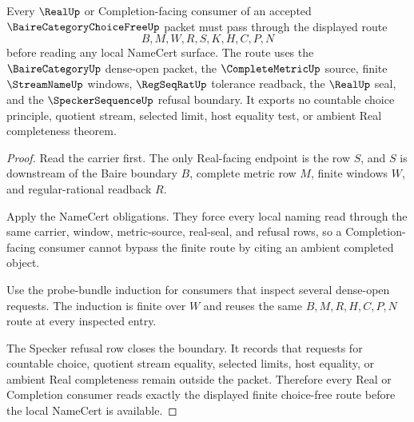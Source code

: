 \begin{theorem}
\label{thm:baire-category-choice-free-real-completion-boundary}
Every $\RealUp$ or Completion-facing consumer of an accepted $\BaireCategoryChoiceFreeUp$ packet must pass through the displayed route
$$
B,M,W,R,S,K,H,C,P,N
$$
before reading any local NameCert surface. The route uses the $\BaireCategoryUp$ dense-open packet, the $\CompleteMetricUp$ source, finite $\StreamNameUp$ windows, $\RegSeqRatUp$ tolerance readback, the $\RealUp$ seal, and the $\SpeckerSequenceUp$ refusal boundary. It exports no countable choice principle, quotient stream, selected limit, host equality test, or ambient Real completeness theorem.
\end{theorem}
\begin{proof}
Read the carrier first. The only Real-facing endpoint is the row $S$, and $S$ is downstream of the Baire boundary $B$, complete metric row $M$, finite windows $W$, and regular-rational readback $R$.

Apply the NameCert obligations. They force every local naming read through the same carrier, window, metric-source, real-seal, and refusal rows, so a Completion-facing consumer cannot bypass the finite route by citing an ambient completed object.

Use the probe-bundle induction for consumers that inspect several dense-open requests. The induction is finite over $W$ and reuses the same $B,M,R,H,C,P,N$ route at every inspected entry.

The Specker refusal row closes the boundary. It records that requests for countable choice, quotient stream equality, selected limits, host equality, or ambient Real completeness remain outside the packet. Therefore every Real or Completion consumer reads exactly the displayed finite choice-free route before the local NameCert is available.
\end{proof}

